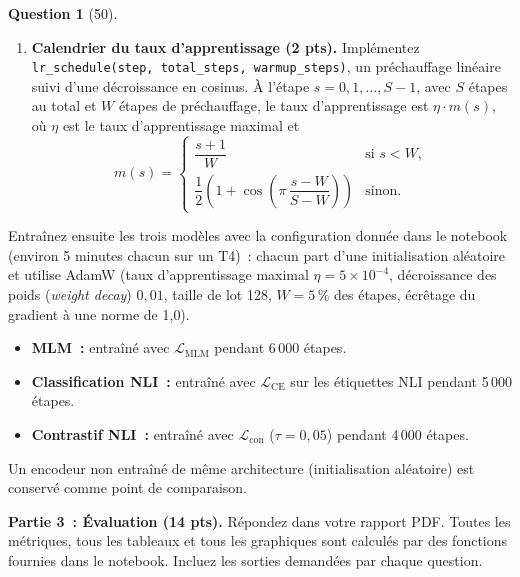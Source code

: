 \documentclass[12pt]{article}
\theoremstyle{definition}
\newtheorem{exercise}{Question}%
\begin{document}
\begin{exercise}[50]
\begin{enumerate}
  \item \textbf{Calendrier du taux d'apprentissage (2 pts).} Implémentez
  \texttt{lr\_schedule(step, total\_steps, warmup\_steps)}, un préchauffage linéaire suivi d'une décroissance en
  cosinus. À l'étape $s = 0, 1, \dots, S - 1$, avec $S$ étapes au total et $W$ étapes de préchauffage, le taux
  d'apprentissage est $\eta \cdot m(s)$, où $\eta$ est le taux d'apprentissage maximal et
  \[
    m(s) = \begin{cases}
      \dfrac{s + 1}{W} & \text{si } s < W, \\[2ex]
      \dfrac{1}{2}\left(1 + \cos\!\left(\pi\, \dfrac{s - W}{S - W}\right)\right) & \text{sinon.}
    \end{cases}
  \]
\end{enumerate}

Entraînez ensuite les trois modèles avec la configuration donnée dans le notebook (environ 5 minutes chacun sur un
T4)~: chacun part d'une initialisation aléatoire et utilise AdamW (taux d'apprentissage maximal
$\eta = 5 \times 10^{-4}$, décroissance des poids (\emph{weight decay}) $0{,}01$, taille de lot 128, $W = 5\,\%$ des
étapes, écrêtage du gradient à une norme de 1{,}0).
\begin{itemize}
  \item \textbf{MLM~:} entraîné avec $\mathcal{L}_{\text{MLM}}$ pendant 6\,000 étapes.
  \item \textbf{Classification NLI~:} entraîné avec $\mathcal{L}_{\text{CE}}$ sur les étiquettes NLI pendant
        5\,000 étapes.
  \item \textbf{Contrastif NLI~:} entraîné avec $\mathcal{L}_{\text{con}}$ ($\tau = 0{,}05$) pendant 4\,000 étapes.
\end{itemize}
Un encodeur non entraîné de même architecture (initialisation aléatoire) est conservé comme point de comparaison.

\textbf{Partie 3~: Évaluation (14 pts).} Répondez dans votre rapport PDF. Toutes les métriques, tous les tableaux et
tous les graphiques sont calculés par des fonctions fournies dans le notebook. Incluez les sorties demandées par
chaque question.


\end{exercise}
\end{document}
